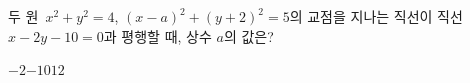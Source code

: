 두 원~$x^2+y^2=4$, $(x-a)^2+(y+2)^2=5$의 교점을 지나는 직선이 직선~$x-2y-10=0$과 평행할 때, 상수 $a$의 값은?
\begin{choices32}{$-2$}{$-1$}{$0$}{$1$}{$2$}\end{choices32}
